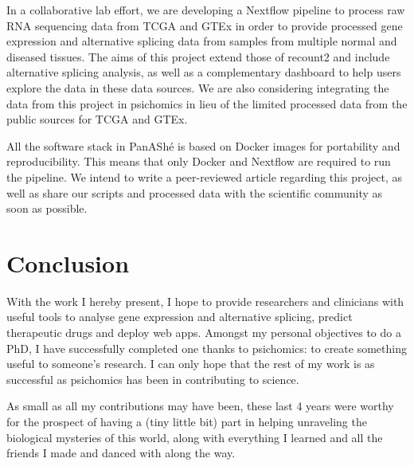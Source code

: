 In a collaborative lab effort, we are developing a Nextflow pipeline to process raw RNA sequencing data from TCGA \cite{chang:2013ww} and GTEx \cite{lonsdale:2013uo} in order to provide processed gene expression and alternative splicing data from samples from multiple normal and diseased tissues. The aims of this project extend those of recount2 \cite{collado-torres:2017uw} and include alternative splicing analysis, as well as a complementary dashboard to help users explore the data in these data sources. We are also considering integrating the data from this project in psichomics in lieu of the limited processed data from the public sources for TCGA and GTEx.

All the software stack in PanAShé is based on Docker images for portability and reproducibility. This means that only Docker and Nextflow are required to run the pipeline. We intend to write a peer-reviewed article regarding this project, as well as share our scripts and processed data with the scientific community as soon as possible.

\section{Conclusion}

With the work I hereby present, I hope to provide researchers and clinicians with useful tools to analyse gene expression and alternative splicing, predict therapeutic drugs and deploy web apps. Amongst my personal objectives to do a PhD, I have successfully completed one thanks to psichomics: to create something useful to someone's research. I can only hope that the rest of my work is as successful as psichomics has been in contributing to science.

As small as all my contributions may have been, these last 4 years were worthy for the prospect of having a (tiny little bit) part in helping unraveling the biological mysteries of this world, along with everything I learned and all the friends I made and danced with along the way.
